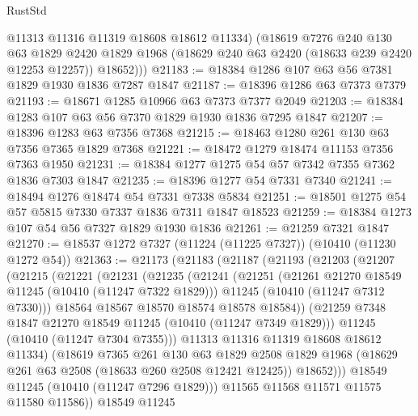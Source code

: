 \begin{lexlean}{RustStd}
\begin{coremodule}
          @11313
          @11316
          @11319
          @18608
          @18612
          @11334)
        (@18619
          @7276
          @240
          @130
          @63
          @1829
          @2420
          @1829
          @1968
          (@18629 @240 @63 @2420 (@18633 @239 @2420 @12253 @12257))
          @18652)))
@21183 := @18384 @1286 @107 @63 @56 @7381 @1829 @1930 @1836 @7287 @1847
@21187 := @18396 @1286 @63 @7373 @7379
@21193 := @18671 @1285 @10966 @63 @7373 @7377 @2049
@21203 := @18384 @1283 @107 @63 @56 @7370 @1829 @1930 @1836 @7295 @1847
@21207 := @18396 @1283 @63 @7356 @7368
@21215 := @18463 @1280 @261 @130 @63 @7356 @7365 @1829 @7368
@21221 := @18472 @1279 @18474 @11153 @7356 @7363 @1950
@21231 := @18384 @1277 @1275 @54 @57 @7342 @7355 @7362 @1836 @7303 @1847
@21235 := @18396 @1277 @54 @7331 @7340
@21241 := @18494 @1276 @18474 @54 @7331 @7338 @5834
@21251 := @18501 @1275 @54 @57 @5815 @7330 @7337 @1836 @7311 @1847 @18523
@21259 := @18384 @1273 @107 @54 @56 @7327 @1829 @1930 @1836
@21261 := @21259 @7321 @1847
@21270 := @18537 @1272 @7327 (@11224 (@11225 @7327)) (@10410 (@11230 @1272 @54))
@21363 := @21173
    (@21183
      (@21187
        (@21193
          (@21203
            (@21207
              (@21215
                (@21221
                  (@21231
                    (@21235
                      (@21241
                        (@21251
                          (@21261 @21270 @18549 @11245 (@10410 (@11247 @7322 @1829)))
                          @11245
                          (@10410 (@11247 @7312 @7330)))
                        @18564
                        @18567
                        @18570
                        @18574
                        @18578
                        @18584))
                    (@21259 @7348 @1847 @21270 @18549 @11245 (@10410 (@11247 @7349 @1829)))
                    @11245
                    (@10410 (@11247 @7304 @7355)))
                  @11313
                  @11316
                  @11319
                  @18608
                  @18612
                  @11334)
                (@18619
                  @7365
                  @261
                  @130
                  @63
                  @1829
                  @2508
                  @1829
                  @1968
                  (@18629 @261 @63 @2508 (@18633 @260 @2508 @12421 @12425))
                  @18652)))
            @18549
            @11245
            (@10410 (@11247 @7296 @1829)))
          @11565
          @11568
          @11571
          @11575
          @11580
          @11586))
      @18549
      @11245

\end{coremodule}
\end{lexlean}
